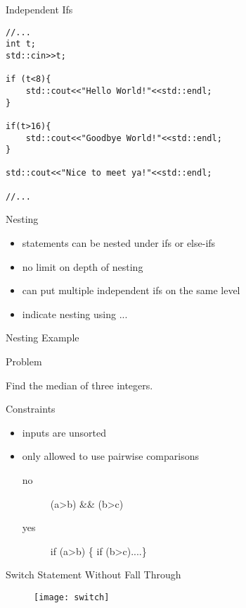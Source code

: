 \documentclass[xcolor={dvipsnames}]{beamer}
\begin{document}
\begin{frame}[fragile]{Independent Ifs}
\begin{verbatim}
//...
int t;
std::cin>>t;

if (t<8){
    std::cout<<"Hello World!"<<std::endl;
}  

if(t>16){
    std::cout<<"Goodbye World!"<<std::endl;
}

std::cout<<"Nice to meet ya!"<<std::endl;

//...   
\end{verbatim}
\end{frame}
\begin{frame}{Nesting}
	\begin{itemize}
		\item statements can be nested under ifs or else-ifs
		\item no limit on depth of nesting
		\item can put multiple independent ifs on the same level
		\item indicate nesting using { ...}
	\end{itemize}
\end{frame}

\begin{frame}{Nesting Example}
	\begin{block}{Problem}
		\begin{center}
	 		Find the median of three  integers.
		\end{center}
	\end{block}
	\pause
	\begin{block}{Constraints}
		\begin{itemize}
			\item inputs are unsorted
			\item only allowed to use pairwise comparisons 
			\begin{description}
				\item[no] (a\textgreater b) \&\& (b\textgreater c)
				\item[yes] if (a\textgreater b) \{ if (b\textgreater c)....\}
			\end{description}
		\end{itemize}
	\end{block}
\end{frame}


\begin{frame}{Switch Statement Without Fall Through}
\begin{center}	
	\begin{figure}
		\texttt{[image: switch]}
	\end{figure}
	\end{center}
\end{frame}
\end{document}
